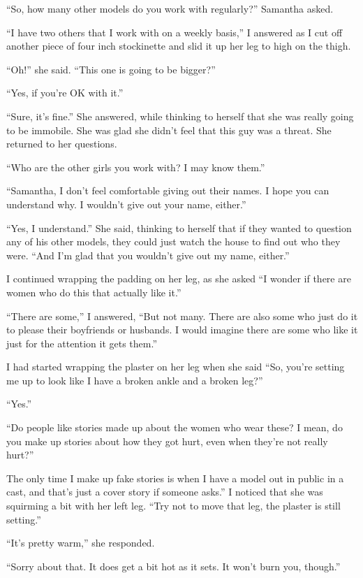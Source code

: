 ``So, how many other models do you work with regularly?'' Samantha asked.

``I have two others that I work with on a weekly basis,'' I answered as I cut off another
piece of four inch stockinette and slid it up her leg to high on the thigh.

``Oh!'' she said. ``This one is going to be bigger?''

``Yes, if you're OK with it.''

``Sure, it's fine.'' She answered, while thinking to herself that she was really going to
be immobile. She was glad she didn't feel that this guy was a threat. She returned to her
questions.

``Who are the other girls you work with? I may know them.''

``Samantha, I don't feel comfortable giving out their names. I hope you can understand
why.
I wouldn't give out your name, either.''

``Yes, I understand.'' She said, thinking to herself that if they wanted to question any
of
his other models, they could just watch the house to find out who they were. ``And I'm glad that
you wouldn't give out my name, either.''

I continued wrapping the padding on her leg, as she asked ``I wonder if there are women
who
do this that actually like it.''

``There are some,'' I answered, ``But not many. There are also some who just do it to
please
their boyfriends or husbands. I would imagine there are some who like it just for the attention
it gets them.''

I had started wrapping the plaster on her leg when she said ``So, you're setting me up to
look like I have a broken ankle and a broken leg?''

``Yes.''

``Do people like stories made up about the women who wear these? I mean, do you make up
stories about how they got hurt, even when they're not really hurt?''

The only time I make up fake stories is when I have a model out in public in a cast, and
that's just a cover story if someone asks.'' I noticed that she was squirming a bit with her
left leg. ``Try not to move that leg, the plaster is still setting.''

``It's pretty warm,'' she responded.

``Sorry about that. It does get a bit hot as it sets. It won't burn you, though.''

